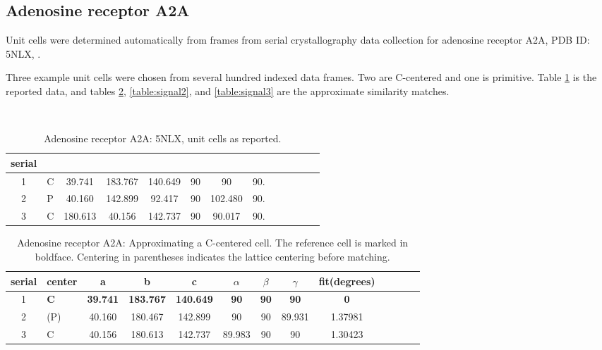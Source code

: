 \documentclass[preprint]{iucr}              %
\numberwithin{equation}{section}
\numberwithin{equation}{section}
\begin{document}
	
	\subsection{Adenosine receptor A2A}
	Unit cells were determined automatically from frames from serial crystallography data collection for adenosine receptor A2A, PDB ID: 5NLX, \cite{weinert2017}.
	
	Three example unit cells were chosen from several hundred indexed data frames.
	Two are C-centered and one is primitive. 
	Table \ref{table:signal0} is the reported data, and tables
	\ref{table:signal1}, \ref{table:signal2}, and \ref{table:signal3}
	are the approximate similarity matches.
	\begin{table}
		\begin{center}
			\caption{Adenosine receptor A2A: 5NLX, unit cells as reported.  }
~~\\
			
			\begin{tabular}{clccccccccccc}
				\toprule
				serial\\
				\midrule
				1&C&39.741&183.767&140.649&90&90&90.\\
				2&P&40.160&142.899&92.417&90&102.480&90.\\
				3&C&180.613&40.156&142.737&90&90.017&90.\\
				\bottomrule 
			\end{tabular}
			\label{table:signal0}
		\end{center}
	\end{table}

	\begin{table}
		\begin{center}
			\caption{Adenosine receptor A2A:  Approximating a C-centered cell.
				The reference cell is marked in boldface.
				 Centering in parentheses indicates the lattice centering before matching.}
			\vspace{3mm}
			\begin{tabular}{clccccccccccc}
				\toprule
serial&center &a & b & c & $\alpha$ & $\beta$ & $\gamma$ & fit(degrees) \\ \midrule         
1&\textbf{C}    & \textbf{39.741} & \textbf{183.767} & \textbf{140.649}  & \textbf{90}  &\textbf{90}  &\textbf{90} &  \textbf{0}\\
2&(P)  & 40.160 & 180.467 & 142.899  & 90  & 90  & 89.931 & 1.37981\\
3&C    & 40.156 & 180.613 & 142.737  & 89.983  & 90  & 90 &  1.30423\\
				\bottomrule
			\end{tabular}
		\end{center}
	\label{table:signal1}
	\end{table}
	
\end{document}
